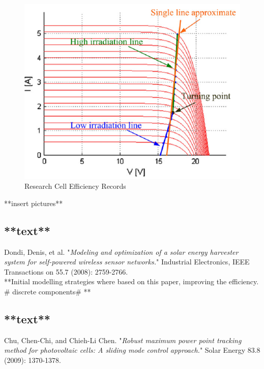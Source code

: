 { \begin{figure}[H]
  \begin{center}
  \includegraphics[width=\textwidth]{images/IVCurve_lui_2}
  \caption{Research Cell Efficiency Records \cite{liu2011fast} }
  \label{fig:Lui_IV_2}
  \end{center}
  \end{figure}





**insert pictures**

\subsection{**text**\cite{dondi2008modeling}}

Dondi, Denis, et al. "\textit{Modeling and optimization of a solar energy harvester system for self-powered wireless sensor networks.}" Industrial Electronics, IEEE Transactions on 55.7 (2008): 2759-2766.\\


**Initial modelling strategies where based on this paper,  improving the efficiency. \# discrete components\# ** 

\subsection{**text**\cite{chu2009robust}}
Chu, Chen-Chi, and Chieh-Li Chen. "\textit{Robust maximum power point tracking method for photovoltaic cells: A sliding mode control approach.}" Solar Energy 83.8 (2009): 1370-1378.\\

}
